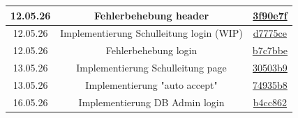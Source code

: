 \begin{center}
\begin{tabular}{| c | c | c |}
		\hline
		12.05.26 & Fehlerbehebung header & \href{https://github.com/Sobottasgithub/AG-Verwaltung/commit/3f90e7f7604c4fbe73fb639eb484dc3a2325be55}{3f90e7f}\\		
		\hline
		12.05.26 & Implementierung Schulleitung login (WIP)& \href{https://github.com/Sobottasgithub/AG-Verwaltung/commit/d7775cec405b8b61829854ea9eb24d4411158714}{d7775ce}\\		
		\hline
		12.05.26 & Fehlerbehebung login & \href{https://github.com/Sobottasgithub/AG-Verwaltung/commit/b7c7bbeca822e3e15bb221e4e757440314da6ea3}{b7c7bbe}\\		
		\hline
		13.05.26 & Implementierung Schulleitung page& \href{https://github.com/Sobottasgithub/AG-Verwaltung/commit/30503b93beb7c628974b8262c216ce0002292786}{30503b9}\\		
		\hline
		13.05.26 & Implementierung "auto accept" & \href{https://github.com/Sobottasgithub/AG-Verwaltung/commit/74935b884b86882d80eb701dd95d1af099283e6a}{74935b8}\\		
		\hline
		16.05.26 & Implementierung DB Admin login & \href{https://github.com/Sobottasgithub/AG-Verwaltung/commit/b4cc86216c674e53a3ea79193a576c37584d295b}{b4cc862}\\		
		\hline
	\end{tabular}
\end{center}
\newpage
